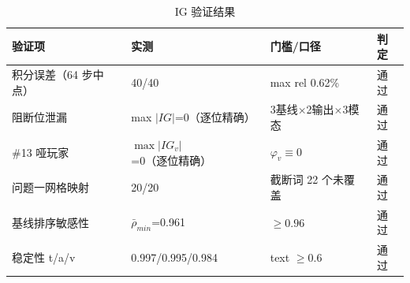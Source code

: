 \begin{table}[htbp]
  \centering\small
\caption{IG 验证结果}
  \label{tab:p3-ig-validation}
  \begin{tabularx}{\linewidth}{@{}p{3.5cm}p{4.0cm}p{4.4cm}X@{}}
    \toprule
    验证项 & 实测 & 门槛/口径 & 判定 \\
    \midrule
    积分误差（64 步中点） & 40/40 & max rel 0.62\% & 通过 \\
    阻断位泄漏 & max $|IG|$=0（逐位精确） & 3基线$\times$2输出$\times$3模态 & 通过 \\
    \#13 哑玩家 & $\max|IG_v|$=0（逐位精确） & $\varphi_v\equiv 0$ & 通过 \\
    问题一网格映射 & 20/20 & 截断词 22 个未覆盖 & 通过 \\
    基线排序敏感性 & $\bar\rho_{min}$=0.961 & $\ge 0.96$ & 通过 \\
    稳定性 t/a/v & 0.997/0.995/0.984 & text $\ge 0.6$ & 通过 \\
    \bottomrule
  \end{tabularx}
\end{table}